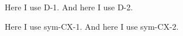 \documentclass[a4paper,fleqn,colorlinks,unicode,lineno]{cas-dc}
\begin{document}
    \printglossary[type=test]
    \printglossary[type=sym-C]

    Here I use \gls{D-1}.
    And here I use \gls{D-2}.

    Here I use \gls{sym-CX-1}.
    And here I use \gls{sym-CX-2}.
\end{document}
